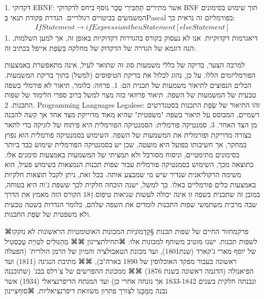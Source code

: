       1. דקדוקי EBNF: אשר מתירים תַּחְבִּירִי סֻכָּר נוסף ביחס לדקדוקי BNF תוך שימוש בסימונים המשמשים בביטויים רגולריים. הגדרת פקודת תנאי בְּPascal בפורמליזם זה נראית כך:
      \begin{align}
      IfStatement → if Expression then Statement [else Statement]
    \end{align}
      1. דיאגרמות דקדוקיות. אנו לא נעסוק בקורס בהגדרות דקדוקיות באופן זה, אך למען השלמות, הנה דוגמא של הגדרה של הדקדוק של מחלקה בִּשְׂפַת אייפל בכתיב זה:

      למרבה הצער, בדיקה של כללי משמעות סוג זה שתואר לעיל, אינה מתאפשרת באמצעות
      הפורמליזמים הללו. על כן, נהוג לכלול את בדיקת הטיפוסים (למשל) בתוך בדיקת
      המשמעות.  הכלים הנפוצים לתיאור משמעות של תכנית הם:
      1. פרוזה: כלומר, תיאור לא פורמלי בשפה טבעית של המשמעות של השפה. תיאור פרוזאי כזה מצוי למשל ברוב ספרי הלימוד של שפות התכנות.
      2. Programming Languages Legalese: זהו התיאור של שְׂפַת התכנות בסטנדרטים רשמיים, המבוסס על תיאור בשפה "משפטית" שהיא מאוד מדוייקת מצד אחד אך קשה להבנה מן הצד האחר.
      3. סמנטיקה פורמלית: הסמנטיקה הפורמלית היא פיתוח של לוגיקה כדי לתאר בצורה מדוייקת ופורמלית את המשמעות של השפה.
      השימוש בסמנטיקה פורמלית הוא נפוץ במחקר, אך חשיבותו בפועל היא מועטה, שכן יש בסמנטיקה הפורמלית שימוש כבד ביותר בסימונים מתימטיים, וניסוח מסורבל ולא תמציתי של המשמעות באמצעות סימנים אלו. כתוצאה מכך, השימוש בסמנטיקה פורמלית עבור שפות תכנות הנמצאות בשימוש פעיל, הוא משימה הרקוליאנית שנדיר שיש מי שמבצע אותה.
      בכל זאת, ניתן לקבל תוצאות חלקיות באמצעות כלים פורמליים כאלו. כך למשל, ישנה הוכחה חלקית לכך ששפת ג'וה היא בטוחה, במובן זה שתכנית בשפה זו אינה יכולה לעשות שגיאות טיפוס.†{18}
      הקורס הזה מאמץ את הדרך שבה מרבית משתמשי שפות התכנות לומדים את השפה שלהם, כלומר
      הגדרות בשטה טבעית ולא משפטית של שְׂפַת התכנות.
      
     
     ⌘פרק{מחזור החיים של שפות תכנות}
     §קַדְמוֹנִיּוֹת
     המכונות האוטומטיות הראשונות לא נזקקו לשפות תכנות. ישנו מוטיב משותף למכונות אלו:
     ⌘תחילת{ציינון}
         ⌘⌘ מֵהַנּוּלִים לִטְוִיַּת טֶכְּסְטִיל של יוסף מארי ג'קארד (שנת1801), ועד מכונת הטאבולציה והמיון של הרמן הולרית' (הפעלה ראשונה בעבור מפקד האוכלוסין של 1890 בארה"ב),
         ⌘⌘ מתיבת הנגינה (1811) ועד הפיאנולה (הדגמה ראשונה בשנת 1876)
         ⌘⌘ ממכונת ההפרשים של צ'רלס בבג' (שתוכננה ונבנתה חלקית בשנים 1833-1842 אך נזנחה אחרי כן) ועד המנתח הדיפרנציאלי (1934) אשר נבנה מִמֵּכָּנוֹ לצורך פתרון משוואת דיפרנציאליות.
        ⌘סוף{ציינון} 
        
